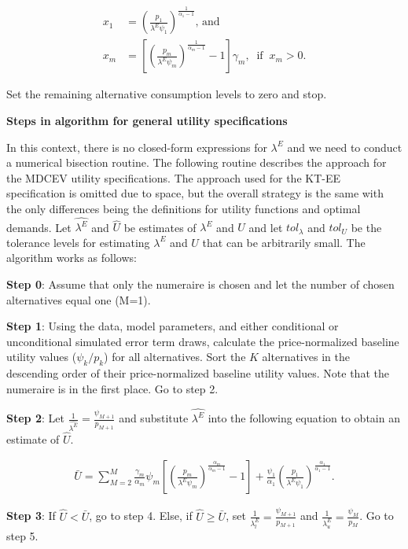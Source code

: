 \begin{align}
\label{eq:optimal_x}
x_1 &=   \left( \frac{p_1}{\lambda^E \psi_1} \right)^\frac{1}{\alpha_1-1}\text{, and} \\
x_m &=   \left[ \left( \frac{p_m}{\lambda^E \psi_m} \right)^\frac{1}{\alpha_m-1}-1 \right]\gamma_m, \; \; \text{if} \; \; x_m > 0.
\end{align}

Set the remaining alternative consumption levels to zero and stop.

\textbf{Steps in algorithm for general utility specifications}

In this context, there is no closed-form expressions for \(\lambda^E\)
and we need to conduct a numerical bisection routine. The following
routine describes the approach for the MDCEV utility specifications. The
approach used for the KT-EE specification is omitted due to space, but
the overall strategy is the same with the only differences being the
definitions for utility functions and optimal demands. Let
\(\hat{\lambda^E}\) and \(\hat{U}\) be estimates of \(\lambda^E\) and
\(U\) and let \(tol_{\lambda}\) and \(tol_{U}\) be the tolerance levels
for estimating \(\lambda^E\) and \(U\) that can be arbitrarily small.
The algorithm works as follows:

\textbf{Step 0}: Assume that only the numeraire is chosen and let the
number of chosen alternatives equal one (M=1).

\textbf{Step 1}: Using the data, model parameters, and either
conditional or unconditional simulated error term draws, calculate the
price-normalized baseline utility values (\(\psi_k/p_k\)) for all
alternatives. Sort the \(K\) alternatives in the descending order of
their price-normalized baseline utility values. Note that the numeraire
is in the first place. Go to step 2.

\textbf{Step 2}: Let
\(\frac{1}{\hat{\lambda^E}} = \frac{\psi_{M+1}}{p_{M+1}}\) and
substitute \(\hat{\lambda^E}\) into the following equation to obtain an
estimate of \(\hat{U}\).

\begin{align}
\bar{U}=\sum_{M=2}^{M} \frac{\gamma_m}{\alpha_m}\psi_m \left[ \left( \frac{p_m}{\lambda^E \psi_m} \right)^\frac{\alpha_m}{\alpha_m-1} - 1 \right] + \frac{\psi_1}{\alpha_1}\left(\frac{p_1}{\lambda^E \psi_1} \right)^\frac{\alpha_1}{\alpha_1-1}.
\end{align}

\textbf{Step 3}: If \(\hat{U} < \bar{U}\), go to step 4. Else, if
\(\hat{U} \geq \bar{U}\), set
\(\frac{1}{\lambda_l^E}= \frac{\psi_{M+1}}{p_{M+1}}\) and
\(\frac{1}{\lambda_u^E}= \frac{\psi_{M}}{p_{M}}\). Go to step 5.

